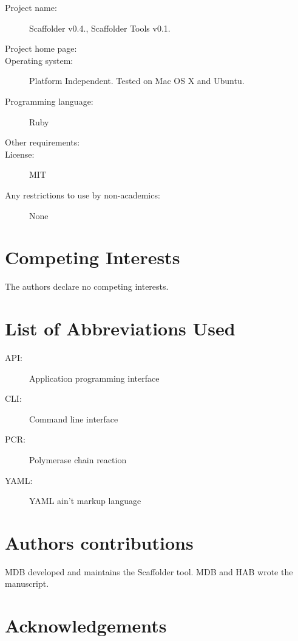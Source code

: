 \documentclass[10pt]{bmc_article}
\newenvironment{bmcformat}{\begin{raggedright}\baselineskip20pt\sloppy\setboolean{publ}{false}}{\end{raggedright}\baselineskip20pt\sloppy}
\begin{document}
\begin{bmcformat}
  \begin{description}
    \item[Project name:] Scaffolder v0.4., Scaffolder Tools
    v0.1.
    \item[Project home page:] \scaffolder
    \item[Operating system:] Platform Independent. Tested on Mac OS X and
    Ubuntu.
    \item[Programming language:] Ruby 
    \item[Other requirements:] 
    \item[License:] MIT \item[Any restrictions to use by non-academics:] None
    \end{description}

\clearpage

\section*{Competing Interests} %

The authors declare no competing interests.

\section*{List of Abbreviations Used} %

  \begin{description}
    \item[API:] Application programming interface
    \item[CLI:] Command line interface
    \item[PCR:] Polymerase chain reaction
    \item[YAML:] YAML ain't markup language\cite{yaml}
  \end{description}

\section*{Authors contributions} %

MDB developed and maintains the Scaffolder tool. MDB and HAB wrote the
manuscript.

\section*{Acknowledgements} %


\end{bmcformat}
\end{document}
